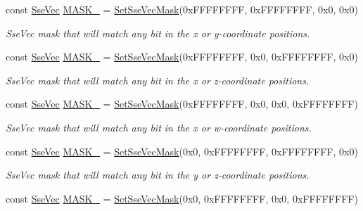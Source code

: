 \begin{DoxyCompactItemize}
const \hyperlink{namespacegfxmath_a0de2243e2b8d0fd46d3af5e036423004}{Sse\+Vec} \hyperlink{namespacegfxmath_aa0a06e585eb58938ab3952d53c917737}{M\+A\+S\+K\+\_} = \hyperlink{namespacegfxmath_ae6fdce7b817a9d0caea6a71c5a377bbb}{Set\+Sse\+Vec\+Mask}(0x\+F\+F\+F\+F\+F\+F\+F\+F, 0x\+F\+F\+F\+F\+F\+F\+F\+F, 0x0, 0x0)
\begin{DoxyCompactList}\small\item\em Sse\+Vec mask that will match any bit in the x or y-\/coordinate positions. \end{DoxyCompactList}\item 
const \hyperlink{namespacegfxmath_a0de2243e2b8d0fd46d3af5e036423004}{Sse\+Vec} \hyperlink{namespacegfxmath_aa01027212a31efde9054027b6a9c54de}{M\+A\+S\+K\+\_} = \hyperlink{namespacegfxmath_ae6fdce7b817a9d0caea6a71c5a377bbb}{Set\+Sse\+Vec\+Mask}(0x\+F\+F\+F\+F\+F\+F\+F\+F, 0x0, 0x\+F\+F\+F\+F\+F\+F\+F\+F, 0x0)
\begin{DoxyCompactList}\small\item\em Sse\+Vec mask that will match any bit in the x or z-\/coordinate positions. \end{DoxyCompactList}\item 
const \hyperlink{namespacegfxmath_a0de2243e2b8d0fd46d3af5e036423004}{Sse\+Vec} \hyperlink{namespacegfxmath_a614228347cb24ffbda356c24735c1b3b}{M\+A\+S\+K\+\_} = \hyperlink{namespacegfxmath_ae6fdce7b817a9d0caea6a71c5a377bbb}{Set\+Sse\+Vec\+Mask}(0x\+F\+F\+F\+F\+F\+F\+F\+F, 0x0, 0x0, 0x\+F\+F\+F\+F\+F\+F\+F\+F)
\begin{DoxyCompactList}\small\item\em Sse\+Vec mask that will match any bit in the x or w-\/coordinate positions. \end{DoxyCompactList}\item 
const \hyperlink{namespacegfxmath_a0de2243e2b8d0fd46d3af5e036423004}{Sse\+Vec} \hyperlink{namespacegfxmath_a0a4b2297562ec2a6515260a20caca407}{M\+A\+S\+K\+\_} = \hyperlink{namespacegfxmath_ae6fdce7b817a9d0caea6a71c5a377bbb}{Set\+Sse\+Vec\+Mask}(0x0, 0x\+F\+F\+F\+F\+F\+F\+F\+F, 0x\+F\+F\+F\+F\+F\+F\+F\+F, 0x0)
\begin{DoxyCompactList}\small\item\em Sse\+Vec mask that will match any bit in the y or z-\/coordinate positions. \end{DoxyCompactList}\item 
const \hyperlink{namespacegfxmath_a0de2243e2b8d0fd46d3af5e036423004}{Sse\+Vec} \hyperlink{namespacegfxmath_ab4dafd60d94026a9b0a4ff0593680a25}{M\+A\+S\+K\+\_} = \hyperlink{namespacegfxmath_ae6fdce7b817a9d0caea6a71c5a377bbb}{Set\+Sse\+Vec\+Mask}(0x0, 0x\+F\+F\+F\+F\+F\+F\+F\+F, 0x0, 0x\+F\+F\+F\+F\+F\+F\+F\+F)

\end{DoxyCompactItemize}
